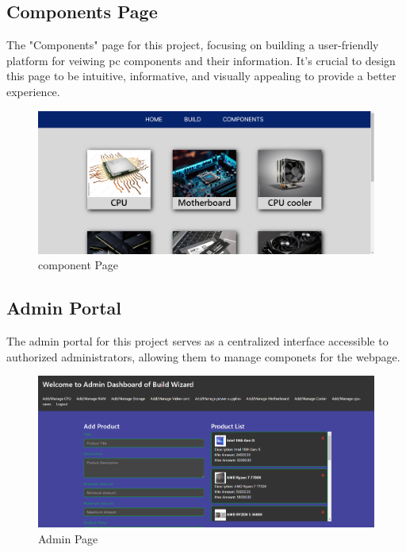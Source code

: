 \subsection{Components Page}
The "Components" page for this project, focusing on building a user-friendly platform for veiwing pc components and their information. It's crucial to design this page to be intuitive, informative, and visually appealing to provide a better experience.
\begin{figure}[H]
    \centering
    \includegraphics[width=16cm]{Diagrams/components.png}
    \caption{component Page}
    \end{figure}
\subsection{Admin Portal}
The admin portal for this project serves as a centralized interface accessible to authorized administrators, allowing them to manage componets for the webpage.
\begin{figure}[H]
    \centering
    \includegraphics[width=16cm]{Diagrams/admin_portal.png}
    \caption{Admin Page}
    \end{figure}
